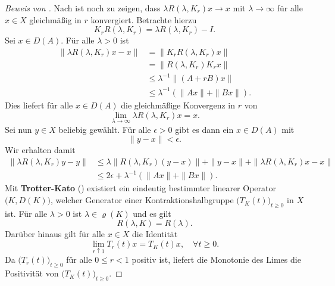 \begin{proof}[Beweis von ]
\par
Nach  ist noch zu zeigen, dass $\lambda R(\lambda, K_r)x\to x$ mit $\lambda\to\infty$ für alle $x\in X$  gleichmäßig in $r$ konvergiert. Betrachte hierzu
\begin{equation*}
K_r R(\lambda, K_r)=\lambda R(\lambda, K_r)-I.
\end{equation*}
Sei $x\in D(A)$. Für alle $\lambda>0$ ist
\begin{align*}
\|\lambda R(\lambda, K_r)x -x\|
&=\|K_r R(\lambda, K_r)x\|\\
&=\|R(\lambda, K_r)K_rx\|\\
&\leq \lambda^{-1}\|(A+rB)x\|\\
&\leq \lambda^{-1}(\|Ax\| + \|Bx\|).
\end{align*}
Dies liefert für alle $x\in D(A)$ die gleichmäßige Konvergenz in $r$ von
\begin{equation*}
    \lim_{\lambda\to\infty}\lambda R(\lambda, K_r)x=x.
\end{equation*}
Sei nun $y\in X$ beliebig gewählt. Für alle $\epsilon >0$ gibt es dann ein $x\in D(A)$ mit
\begin{equation*}
    \|y - x\|< \epsilon.
\end{equation*}
Wir erhalten damit
\begin{align*}
\|\lambda R(\lambda, K_r)y - y\|
&\leq \lambda \|R(\lambda, K_r)(y-x)\| + \|y-x\| + \|\lambda R(\lambda, K_r)x -x\|\\
&\leq 2\epsilon + \lambda^{-1}(\|Ax\| + \|Bx\|).
\end{align*}
Mit \textbf{Trotter-Kato} () existiert ein eindeutig bestimmter linearer Operator $\big(K, D(K)\big)$, welcher Generator einer Kontraktionshalbgruppe $\big(T_K(t)\big)_{t\geq0}$ in $X$ ist. Für alle $\lambda>0$ ist $\lambda\in\varrho(K)$ und es gilt
\begin{equation*}
    R(\lambda, K)=R(\lambda).
\end{equation*}
Darüber hinaus gilt für alle $x\in X$ die Identität
\begin{equation*}
\lim_{r\uparrow 1} T_r(t)x = T_K(t)x,\quad\forall t\geq0.
\end{equation*}
Da $\big(T_r(t)\big)_{t\geq0}$ für alle $0\leq r <1$ positiv ist, liefert die  Monotonie des Limes die Positivität von  $\big(T_K(t)\big)_{t\geq0}$.


\end{proof}

